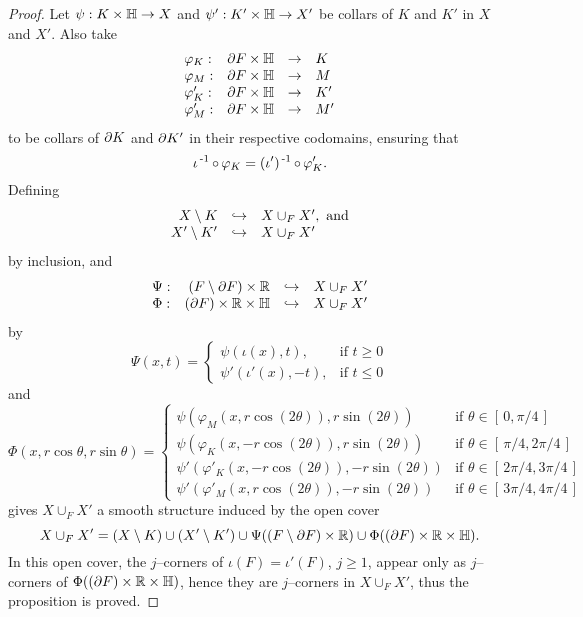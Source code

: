 \begin{proof}
	Let $\psi:K\times\mathbb{H}\to X$ and $\psi':K'\times\mathbb{H} \to X'$ be collars of $K$ and $K'$ in $X$ and $X'$.
	Also take
	\[
		\begin{array}{lrcl}
			\varphi_K:&
			\partial F\times\mathbb{H}&
			\to&
			K\\
			\varphi_M:&
			\partial F\times\mathbb{H}&
			\to&
			M\\
			\varphi_K':&
			\partial F\times\mathbb{H}&
			\to&
			K'\\
			\varphi_M':&
			\partial F\times\mathbb{H}&
			\to&
			M'\\		
		\end{array}
	\]
	to be collars of $\partial K$ and $\partial K'$ in their respective codomains, ensuring that 
	\[
		\iota\inv\comp \varphi_K = (\iota')\inv\comp \varphi_K'.
	\]
	Defining
	\[
		\begin{array}{rcl}
			X\setminus K	&	\hookrightarrow	& 	X\cup_F X', \textrm{ and}	\\
			X'\setminus K'	&	\hookrightarrow	&	X\cup_F X'		
		\end{array}
	\]
	by inclusion, and
	\[
		\begin{array}{crcl}
			\Psi:&(F\setminus\partial F)\times\mathbb{R}&\hookrightarrow&X\cup_F X'\\
			\Phi:&(\partial F)\times\mathbb{R}\times\mathbb{H}&\hookrightarrow&X\cup_F X'		
		\end{array}
	\]
	by
	\[
		\Psi(x,t)=
		\begin{cases}
			\psi(\iota(x),t),		& 	\mbox{if } t\geq 0 \\
			\psi'(\iota'(x),-t),	&	\mbox{if } t\leq 0
		\end{cases}	
	\]
	and
	\[
		\Phi(x,r\cos\theta,r\sin\theta)=
		\begin{cases}
			\psi(\varphi_M(x,r\cos(2\theta)),r\sin(2\theta))
				&	\mbox{if } \theta\in[\,0,\pi/4\,]		\\
			\psi(\varphi_K(x,-r\cos(2\theta)),r\sin(2\theta))
				&	\mbox{if } \theta\in[\,\pi/4,2\pi/4\,]	\\
			\psi'(\varphi'_K(x,-r\cos(2\theta)),-r\sin(2\theta))				
				&	\mbox{if } \theta\in[\,2\pi/4,3\pi/4\,]	\\
			\psi'(\varphi'_M(x,r\cos(2\theta)),-r\sin(2\theta))				
				&	\mbox{if } \theta\in[\,3\pi/4,4\pi/4\,]
		\end{cases}	
	\]
	gives $X\cup_F X'$ a smooth structure induced by the open cover
	\[
		X\cup_F X'=(X\setminus K)\cup(X'\setminus K')\cup\Psi((F\setminus\partial F)\times\mathbb{R})\cup	\Phi((\partial F)\times\mathbb{R}\times\mathbb{H}).
	\]
	In this open cover, the $j$--corners of $\iota(F)=\iota'(F)$, $j\geq 1$, appear only as $j$--corners of $\Phi((\partial F)\times\mathbb{R}\times\mathbb{H})$, hence they are $j$--corners in $X\cup_F X'$, thus the proposition is proved.
\end{proof}

